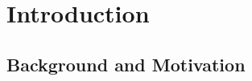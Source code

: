 \chapter{Introduction}
\label{cha:introduction}

\begin{comment}
All chapters should begin with an introduction before any sections, giving an overview of the chapter content.
Each section should in addition start with an introduction before its subsections begin.
Chapters with just one section --- or sections with just one sub-section --- should be avoided.
Think carefully about chapter and section titles as each title stands alone in the table of contents (without associated text)
and should convey the meaning of the contents of the chapter or section.

In all chapters and sections it is important to write clearly and concisely. Avoid repetitions and if needed refer back to the original discussion or presentation.
Each new section, subsection or paragraph should provide the reader with new information and be written in your own words. Avoid direct quotes.
If you use direct quotes, unless the quote itself is very significant, you are conveying to the reader that you are unable to express this discussion or fact yourself.
Such direct quotes also break the flow of the language (yours to someone else's).
\end{comment}

\section{Background and Motivation}\label{sec:background-and-motivation}
\label{sec:BackgroundAndMotivation}

